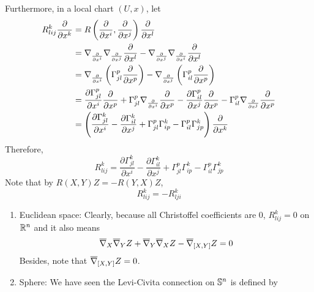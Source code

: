 \begin{enumerate}[label=\arabic{*}.]
	\noindent Furthermore, in a local chart $(U,x)$, let
	\begin{equation*}
		\begin{aligned}
			R^k_{lij}\frac{\partial}{\partial x^k} &= R\left(\frac{\partial}{\partial x^i},\frac{\partial}{\partial x^j}\right)\frac{\partial}{\partial x^l} \\
			&= \nabla_{\frac{\partial}{\partial x^i}}\nabla_{\frac{\partial}{\partial x^j}}\frac{\partial}{\partial x^l} - \nabla_{\frac{\partial}{\partial x^j}}\nabla_{\frac{\partial}{\partial x^i}}\frac{\partial}{\partial x^l}  \\
			&= \nabla_{\frac{\partial}{\partial x^i}}\left(\Gamma^p_{jl}\frac{\partial}{\partial x^p}\right) - \nabla_{\frac{\partial}{\partial x^j}}\left(\Gamma^p_{il}\frac{\partial}{\partial x^p}\right) \\
			&= \frac{\partial \Gamma^p_{jl}}{\partial x^i}\frac{\partial}{\partial x^p} + \Gamma^p_{jl} \nabla_{\frac{\partial}{\partial x^i}}\frac{\partial}{\partial x^p}-\frac{\partial \Gamma^p_{il}}{\partial x^j}\frac{\partial}{\partial x^p} - \Gamma^p_{il} \nabla_{\frac{\partial}{\partial x^j}}\frac{\partial}{\partial x^p} \\
			&= \left(\frac{\partial \Gamma^k_{jl}}{\partial x^i} - \frac{\partial \Gamma^k_{il}}{\partial x^j}+\Gamma^p_{jl}\Gamma^k_{ip} - \Gamma^p_{il}\Gamma^k_{jp}\right)\frac{\partial}{\partial x^k}
		\end{aligned}
	\end{equation*}
	Therefore,
	\begin{equation*}
		R^k_{lij} = \frac{\partial \Gamma^k_{jl}}{\partial x^i} - \frac{\partial \Gamma^k_{il}}{\partial x^j}+\Gamma^p_{jl}\Gamma^k_{ip} - \Gamma^p_{il}\Gamma^k_{jp}
	\end{equation*}
	Note that by $R(X,Y)Z = - R(Y,X)Z$,
	\begin{equation*}
		R^k_{lij} = -R^k_{lji}
	\end{equation*}
	\begin{exam}
		\begin{enumerate}[label=(\arabic{*})]
			\item Euclidean space: Clearly, because all Christoffel coefficients are $0$, $R^k_{lij} = 0$ on $\mathbb{R}^n$ and it also means
			\begin{equation*}
				\overline{\nabla}_X\overline{\nabla}_Y Z + \overline{\nabla}_Y\overline{\nabla}_X Z - \overline{\nabla}_{[X,Y]}Z = 0
			\end{equation*}
			Besides, note that $\overline{\nabla}_{[X,Y]}Z = 0$.
			\item Sphere: We have seen the Levi-Civita connection on $\mathbb{S}^n$ is defined by

\end{enumerate}
\end{exam}
\end{enumerate}
